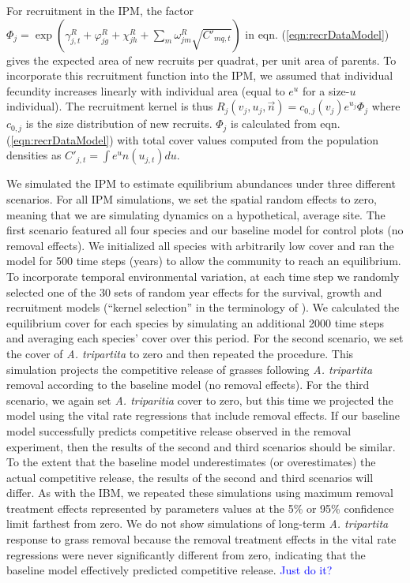 \documentclass[11pt]{article}
\newcommand{\comment}{\textcolor{blue}}
\begin{document}
\begin{doublespacing}
For recruitment in the IPM, the factor $ \Phi_j  =\exp{\left(\gamma_{j,t}^R +  \varphi_{jg}^R + \chi_{jh}^R + 
\sum \limits_{m} \omega_{jm}^R \sqrt{C'_{mq,t}} \right)}$
in eqn. (\ref{eqn:recrDataModel}) gives the expected 
area of new recruits per quadrat, per unit area of parents. To incorporate this recruitment function into the IPM, we assumed that individual fecundity increases linearly with individual area (equal to $e^u$ for a size-$u$ individual). The recruitment kernel is thus
$R_j(v_j,u_j,\vec{n})=c_{0,j}(v_j)e^{u_j}\Phi_j$ \citep{adler_coexistence_2010} where $c_{0,j}$ is the
size distribution of new recruits. $\Phi_j$ is calculated from eqn. (\ref{eqn:recrDataModel}) with total cover values computed from the population densities as $C'_{j,t} = \int e^u n(u_{j,t}) du$. 

We simulated the IPM to estimate equilibrium abundances under three different scenarios. For all IPM simulations, we set the spatial random effects to zero, meaning that we are simulating dynamics on a hypothetical, average site. The first scenario featured all four species and our baseline model for control plots (no removal effects). We initialized all species with arbitrarily low cover and ran the model for 500 time steps (years) to allow the community to reach an equilibrium. To incorporate temporal environmental variation, at each time step we randomly selected one of the 30 sets of random year effects for the survival, growth and recruitment models (``kernel selection'' in the terminology of \citealt{metcalf_statistical_2015}). We calculated the equilibrium cover for each species by simulating an additional 2000 time steps and averaging each species' cover over this period. For the second scenario, we set the cover of \textit{A. tripartita} to zero and then repeated the procedure. This simulation projects the competitive release of grasses following \textit{A. tripartita} removal according to the baseline model (no removal effects). For the third scenario, we again set  \textit{A. triparitia} cover to zero, but this time we projected the model using the vital rate regressions that include removal effects. If our baseline model successfully predicts competitive release observed in the removal experiment, then the results of the second and third scenarios should be similar. To the extent that the baseline model underestimates (or overestimates) the actual competitive release, the results of the second and third scenarios will differ. As with the IBM, we repeated these simulations using maximum removal treatment effects represented by parameters values at the 5\% or 95\% confidence limit farthest from zero. We do not show simulations of long-term \textit{A. tripartita} response to grass removal because the removal treatment effects in the vital rate regressions were never significantly different from zero, indicating that the baseline model effectively predicted competitive release. \comment{Just do it?}



\end{doublespacing}
\end{document}
